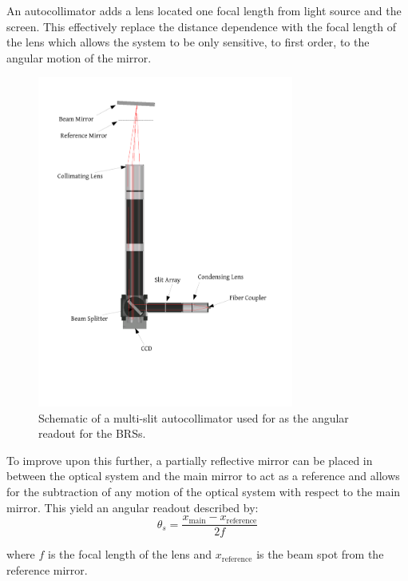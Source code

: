 \documentclass [12pt, proquest]{uwthesis}[2019]
\begin{document}
An autocollimator adds a lens located one focal length from light source and the screen. This effectively replace the distance dependence with the focal length of the lens which allows the system to be only sensitive, to first order, to the angular motion of the mirror.

\begin{figure}%
\begin{center}
 \includegraphics[width=0.75\textwidth]{Autocollimator.pdf}
\caption[Schematic of a multi-slit autocollimator]{Schematic of a multi-slit autocollimator used for as the angular readout for the BRSs.}
\label{ACFig}
\end{center}
\end{figure}

To improve upon this further, a partially reflective mirror can be placed in between the optical system and the main mirror to act as a reference and allows for the subtraction of any motion of the optical system with respect to the main mirror. This yield an angular readout described by:
\begin{equation}
\theta_{s}=\frac{x_{\text{main}}-x_{\text{reference}}}{2f}
\label{ACEq}
\end{equation}

where $f$ is the focal length of the lens and $x_\text{reference}$ is the beam spot from the reference mirror.
\end{document}

